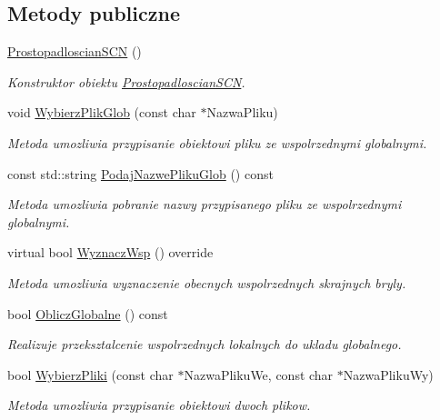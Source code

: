 \subsection*{Metody publiczne}
\begin{DoxyCompactItemize}
\item 
\hyperlink{classProstopadloscianSCN_a8288627cc69c54812c06be68950615f5}{Prostopadloscian\+S\+CN} ()
\begin{DoxyCompactList}\small\item\em Konstruktor obiektu \hyperlink{classProstopadloscianSCN}{Prostopadloscian\+S\+CN}. \end{DoxyCompactList}\item 
void \hyperlink{classProstopadloscianSCN_aedacd1e8362390241287296f5107d493}{Wybierz\+Plik\+Glob} (const char $\ast$Nazwa\+Pliku)
\begin{DoxyCompactList}\small\item\em Metoda umozliwia przypisanie obiektowi pliku ze wspolrzednymi globalnymi. \end{DoxyCompactList}\item 
const std\+::string \hyperlink{classProstopadloscianSCN_a203c4bf0a0e65ed9896199e7a6dc498b}{Podaj\+Nazwe\+Pliku\+Glob} () const
\begin{DoxyCompactList}\small\item\em Metoda umozliwia pobranie nazwy przypisanego pliku ze wspolrzednymi globalnymi. \end{DoxyCompactList}\item 
virtual bool \hyperlink{classProstopadloscianSCN_acdd4a5c10fb6347ad65b1a516ee83b01}{Wyznacz\+Wsp} () override
\begin{DoxyCompactList}\small\item\em Metoda umozliwia wyznaczenie obecnych wspolrzednych skrajnych bryly. \end{DoxyCompactList}\item 
bool \hyperlink{classProstopadloscianSCN_ada3c51233b828c9ee8466a1c4270906b}{Oblicz\+Globalne} () const
\begin{DoxyCompactList}\small\item\em Realizuje przeksztalcenie wspolrzednych lokalnych do ukladu globalnego. \end{DoxyCompactList}\item 
bool \hyperlink{classProstopadloscianSCN_a397c310956e20068dc3588ee4d4a9c87}{Wybierz\+Pliki} (const char $\ast$Nazwa\+Pliku\+We, const char $\ast$Nazwa\+Pliku\+Wy)
\begin{DoxyCompactList}\small\item\em Metoda umozliwia przypisanie obiektowi dwoch plikow. \end{DoxyCompactList}\item 

\end{DoxyCompactItemize}
